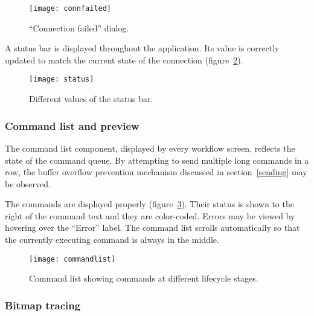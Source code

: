 \begin{figure}[ht]
    \begin{center}
        \texttt{[image: connfailed]}
        \caption{``Connection failed'' dialog.}
        \label{connfailed}
    \end{center}
\end{figure}

A status bar is displayed throughout the application. Its value is correctly
updated to match the current state of the connection (figure~\ref{status}).

\begin{figure}[ht]
    \begin{center}
        \texttt{[image: status]}
        \caption{Different values of the status bar.}
        \label{status}
    \end{center}
\end{figure}

\subsubsection{Command list and preview}

The command list component, displayed by every workflow screen, reflects the
state of the command queue. By attempting to send multiple long commands in a
row, the buffer overflow prevention mechanism discussed in section~\ref{sending}
may be observed.

The commands are displayed properly (figure~\ref{commandlist}). Their status is
shown to the right of the command text and they are color-coded. Errors may be
viewed by hovering over the ``Error'' label. The command list scrolls
automatically so that the currently executing command is always in the middle.

\begin{figure}[ht]
    \begin{center}
        \texttt{[image: commandlist]}
        \caption{Command list showing commands at different lifecycle stages.}
        \label{commandlist}
    \end{center}
\end{figure}

\subsubsection{Bitmap tracing}
